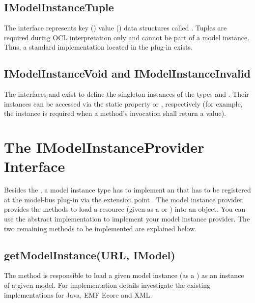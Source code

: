 \subsection{IModelInstanceTuple}

The interface  represents key
() value () data
structures called . Tuples are required during OCL
interpretation only and cannot be part of a model instance. Thus, a standard
 implementation located in the plug-in
 exists.


\subsection{IModelInstanceVoid and IModelInstanceInvalid}

The interfaces  and  exist 
to define the singleton instances of the types  and 
. Their instances can be accessed via the static property 
 or , 
respectively (for example, the  instance is required
when a method's invocation shall return a  value).



\section{The IModelInstanceProvider Interface}

Besides the , a model instance type has to 
implement an  that has to be registered at 
the model-bus plug-in via the extension point . The 
model instance provider provides the methods to load a resource (given as a 
 or ) into an  object. You can use
the abstract implementation  to implement
your model instance provider. The two remaining methods to be implemented are 
explained below.


\subsection{getModelInstance(URL, IModel)}

The method  is responsible to load a given 
model instance (as a ) as an instance of a given model. For 
implementation details investigate the existing implementations for Java, 
\acs{EMF} Ecore and \acs{XML}.


